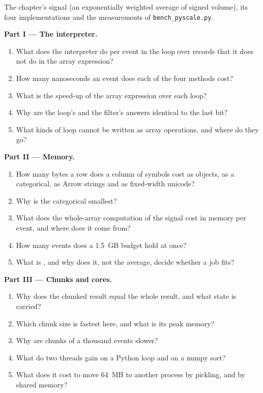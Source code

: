 \begin{problem}\label{pb:pl:python-at-scale:1}
The chapter's signal (an exponentially weighted average of signed volume), its four implementations and the measurements of
\texttt{bench\_pyscale.py}.

\medskip\noindent\textbf{Part I --- The interpreter.}
\begin{enumerate}
\item What does the interpreter do per event in the loop over records that it does not do in the array expression?
\item How many nanoseconds an event does each of the four methods cost?
\item What is the speed-up of the array expression over each loop?
\item Why are the loop's and the filter's answers identical to the last bit?
\item What kinds of loop cannot be written as array operations, and where do they go?
\end{enumerate}

\medskip\noindent\textbf{Part II --- Memory.}
\begin{enumerate}[resume]
\item How many bytes a row does a column of symbols cost as objects, as a categorical, as Arrow strings and as fixed-width unicode?
\item Why is the categorical smallest?
\item What does the whole-array computation of the signal cost in memory per event, and where does it come from?
\item How many events does a 1.5~GB budget hold at once?
\item What is , and why does it, not the average, decide whether a job fits?
\end{enumerate}

\medskip\noindent\textbf{Part III --- Chunks and cores.}
\begin{enumerate}[resume]
\item Why does the chunked result equal the whole result, and what state is carried?
\item Which chunk size is fastest here, and what is its peak memory?
\item Why are chunks of a thousand events slower?
\item What do two threads gain on a Python loop and on a numpy sort?
\item What does it cost to move 64~MB to another process by pickling, and by shared memory?
\end{enumerate}


\end{problem}
